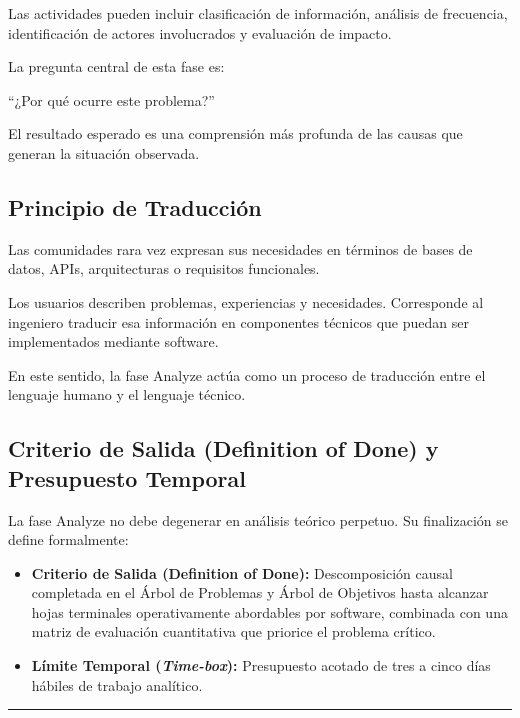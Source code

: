 \documentclass[14pt,a4paper,oneside]{extbook}
\begin{document}
Las actividades pueden incluir clasificación de información, análisis de frecuencia, identificación de actores involucrados y evaluación de impacto.

La pregunta central de esta fase es:

\begin{keyquestion}
\enquote{¿Por qué ocurre este problema?}
\end{keyquestion}

El resultado esperado es una comprensión más profunda de las causas que generan la situación observada.

\subsection{Principio de Traducción}

Las comunidades rara vez expresan sus necesidades en términos de bases de datos, APIs, arquitecturas o requisitos funcionales.

Los usuarios describen problemas, experiencias y necesidades. Corresponde al ingeniero traducir esa información en componentes técnicos que puedan ser implementados mediante software.

En este sentido, la fase Analyze actúa como un proceso de traducción entre el lenguaje humano y el lenguaje técnico.

\subsection{Criterio de Salida (Definition of Done) y Presupuesto Temporal}

La fase Analyze no debe degenerar en análisis teórico perpetuo. Su finalización se define formalmente:

\begin{itemize}
\item \textbf{Criterio de Salida (Definition of Done):} Descomposición causal completada en el Árbol de Problemas y Árbol de Objetivos hasta alcanzar hojas terminales operativamente abordables por software, combinada con una matriz de evaluación cuantitativa que priorice el problema crítico.
\item \textbf{Límite Temporal (\textit{Time-box}):} Presupuesto acotado de tres a cinco días hábiles de trabajo analítico.
\end{itemize}

\par\vspace{1.5em}\noindent\hfill\rule{0.25\textwidth}{0.6pt}\hfill\par\vspace{1.5em}
\end{document}
